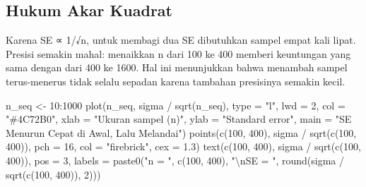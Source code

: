 \documentclass[
  indonesian,
  letterpaper,
]{book}
\newenvironment{Shaded}{\begin{snugshade}}{\end{snugshade}}
\newcommand{\AttributeTok}[1]{\textcolor[rgb]{0.40,0.45,0.13}{#1}}
\newcommand{\DecValTok}[1]{\textcolor[rgb]{0.68,0.00,0.00}{#1}}
\newcommand{\FloatTok}[1]{\textcolor[rgb]{0.68,0.00,0.00}{#1}}
\newcommand{\FunctionTok}[1]{\textcolor[rgb]{0.28,0.35,0.67}{#1}}
\newcommand{\NormalTok}[1]{\textcolor[rgb]{0.00,0.23,0.31}{#1}}
\newcommand{\OtherTok}[1]{\textcolor[rgb]{0.00,0.23,0.31}{#1}}
\newcommand{\SpecialCharTok}[1]{\textcolor[rgb]{0.37,0.37,0.37}{#1}}
\newcommand{\StringTok}[1]{\textcolor[rgb]{0.13,0.47,0.30}{#1}}
\begin{document}
\subsection{Hukum Akar Kuadrat}\label{hukum-akar-kuadrat}

Karena SE ∝ 1/√n, untuk membagi dua SE dibutuhkan sampel empat kali
lipat. Presisi semakin mahal: menaikkan n dari 100 ke 400 memberi
keuntungan yang sama dengan dari 400 ke 1600. Hal ini menunjukkan bahwa
menambah sampel terus-menerus tidak selalu sepadan karena tambahan
presisinya semakin kecil.

\begin{Shaded}
\begin{Highlighting}[]
\NormalTok{n\_seq }\OtherTok{\textless{}{-}} \DecValTok{10}\SpecialCharTok{:}\DecValTok{1000}
\FunctionTok{plot}\NormalTok{(n\_seq, sigma }\SpecialCharTok{/} \FunctionTok{sqrt}\NormalTok{(n\_seq), }\AttributeTok{type =} \StringTok{"l"}\NormalTok{, }\AttributeTok{lwd =} \DecValTok{2}\NormalTok{, }\AttributeTok{col =} \StringTok{"\#4C72B0"}\NormalTok{,}
\AttributeTok{xlab =} \StringTok{"Ukuran sampel (n)"}\NormalTok{, }\AttributeTok{ylab =} \StringTok{"Standard error"}\NormalTok{,}
\AttributeTok{main =} \StringTok{"SE Menurun Cepat di Awal, Lalu Melandai"}\NormalTok{)}
\FunctionTok{points}\NormalTok{(}\FunctionTok{c}\NormalTok{(}\DecValTok{100}\NormalTok{, }\DecValTok{400}\NormalTok{), sigma }\SpecialCharTok{/} \FunctionTok{sqrt}\NormalTok{(}\FunctionTok{c}\NormalTok{(}\DecValTok{100}\NormalTok{, }\DecValTok{400}\NormalTok{)), }\AttributeTok{pch =} \DecValTok{16}\NormalTok{, }\AttributeTok{col =} \StringTok{"firebrick"}\NormalTok{, }\AttributeTok{cex =}
\FloatTok{1.3}\NormalTok{)}
\FunctionTok{text}\NormalTok{(}\FunctionTok{c}\NormalTok{(}\DecValTok{100}\NormalTok{, }\DecValTok{400}\NormalTok{), sigma }\SpecialCharTok{/} \FunctionTok{sqrt}\NormalTok{(}\FunctionTok{c}\NormalTok{(}\DecValTok{100}\NormalTok{, }\DecValTok{400}\NormalTok{)), }\AttributeTok{pos =} \DecValTok{3}\NormalTok{,}
\AttributeTok{labels =} \FunctionTok{paste0}\NormalTok{(}\StringTok{"n = "}\NormalTok{, }\FunctionTok{c}\NormalTok{(}\DecValTok{100}\NormalTok{, }\DecValTok{400}\NormalTok{), }\StringTok{"}\SpecialCharTok{\textbackslash{}n}\StringTok{SE = "}\NormalTok{, }\FunctionTok{round}\NormalTok{(sigma }\SpecialCharTok{/} \FunctionTok{sqrt}\NormalTok{(}\FunctionTok{c}\NormalTok{(}\DecValTok{100}\NormalTok{,}
\DecValTok{400}\NormalTok{)), }\DecValTok{2}\NormalTok{)))}
\end{Highlighting}
\end{Shaded}
\end{document}
